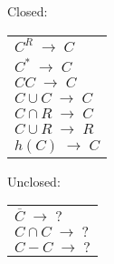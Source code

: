 \documentclass[10pt,landscape]{article}
\newcommand{\spto}{%
    \;\to\;%
}
\begin{document}
\begin{multicols*}{3}
Closed:\\
\begin{tabular}{l}
$C^R \spto C$ \\
$C^* \spto C$ \\
$CC \spto C$ \\
$C \cup C \spto C$ \\
$C \cap R \spto C$ \\
$C \cup R \spto R$ \\
$h(C) \spto C$ \\
\end{tabular}

Unclosed:\\
\begin{tabular}{l}
$\overline{C} \spto ?$ \\
$C \cap C \spto ?$ \\
$C - C \spto ?$
\end{tabular}

\end{multicols*}
\end{document}
